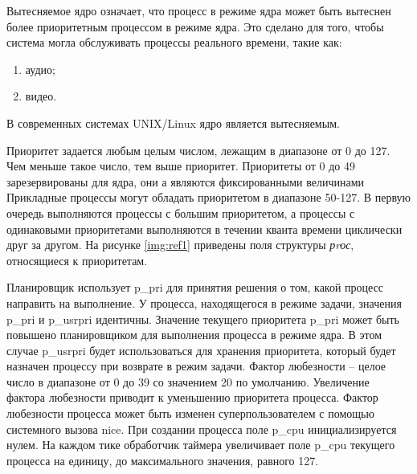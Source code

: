 Вытесняемое ядро означает, что процесс в режиме ядра 
может быть вытеснен более приоритетным процессом в режиме ядра.
Это сделано для того, 
чтобы система могла обслуживать процессы реального времени,
такие как:

\begin{enumerate}
	\item аудио;
	\item видео.
\end{enumerate}

В современных системах UNIX/Linux ядро является вытесняемым.

Приоритет задается любым целым числом, лежащим в диапазоне от 0 до 127. 
Чем меньше такое число, тем выше приоритет. 
Приоритеты от 0 до 49 зарезервированы для ядра, они а являются фиксированными величинами
Прикладные процессы могут обладать приоритетом в диапазоне 50-127.
В первую очередь выполняются процессы с большим приоритетом,
а процессы с одинаковыми приоритетами выполняются в течении кванта
времени циклически друг за другом. 
На рисунке \ref{img:ref1} приведены поля структуры \textit{рrос},
относящиеся к приоритетам.

\begin{figure}[ht!]
\end{figure}

Планировщик использует p\_pri для принятия решения о том,
какой процесс направить на выполнение.
У процесса, находящегося в режиме задачи, значения p\_pri и p\_usrpri идентичны.
Значение текущего приоритета p\_pri может быть повышено планировщиком для выполнения процесса в режиме ядра. 
В этом случае p\_usrpri будет использоваться для хранения приоритета, который будет назначен процессу
при возврате в режим задачи. 
Фактор любезности – целое число в диапазоне от 0 до 39 со значением
20 по умолчанию. Увеличение фактора любезности приводит к уменьшению 
приоритета процесса. Фактор любезности процесса может быть
изменен суперпользователем с помощью системного вызова nice.
При создании процесса поле p\_cpu инициализируется нулем. 
На каждом тике обработчик 
таймера увеличивает поле p\_cpu текущего процесса на единицу,
до максимального значения, 
равного 127.

